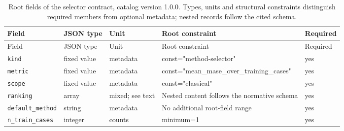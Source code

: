 \begingroup\small
\begin{longtable}{@{}p{}p{}p{}p{}p{}@{}}
\caption{Root fields of the selector contract, catalog version 1.0.0. Types, units and structural constraints distinguish required members from optional metadata; nested records follow the cited schema.}\label{tab:contract-selector}\\
\toprule Field & JSON type & Unit & Root constraint & Required\\\midrule\endfirsthead
\toprule Field & JSON type & Unit & Root constraint & Required\\\midrule\endhead
\texttt{kind} & fixed value & metadata & const="method-selector" & yes\\
\texttt{metric} & fixed value & metadata & const="mean\_\allowbreak{}mase\_\allowbreak{}over\_\allowbreak{}training\_\allowbreak{}cases" & yes\\
\texttt{scope} & fixed value & metadata & const="classical" & yes\\
\texttt{ranking} & array & mixed; see text & Nested content follows the normative schema & yes\\
\texttt{default\_\allowbreak{}method} & string & metadata & No additional root-field range & yes\\
\texttt{n\_\allowbreak{}train\_\allowbreak{}cases} & integer & counts & minimum=1 & yes\\
\bottomrule
\end{longtable}
\endgroup
